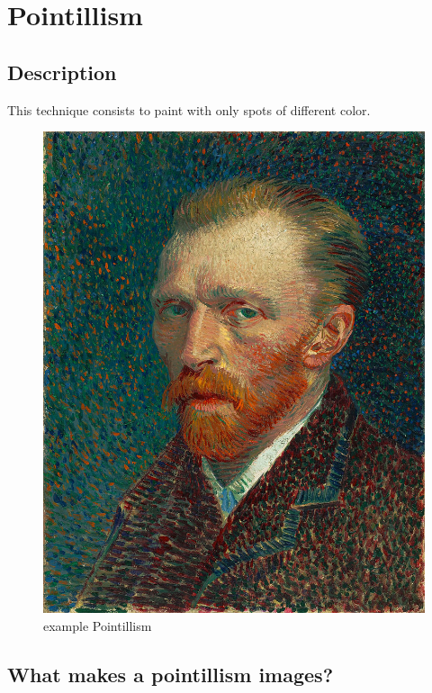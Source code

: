 \documentclass[12pt]{article}
\begin{document}
\section{Pointillism}

\subsection*{Description}

This technique consists to paint with only spots of different color.

\begin{figure}[!ht]
    \begin{center}
        \includegraphics[scale=0.15]{image/VanGogh.jpg}
        \caption{example Pointillism}
    \end{center}
\end{figure}

\subsection{What makes a pointillism images?}
\end{document}
